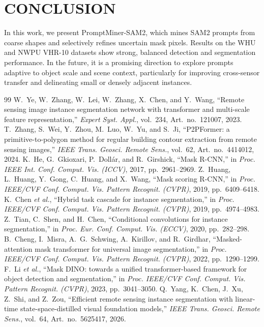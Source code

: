 \documentclass{article}
\begin{document}
\vspace{-1.5\baselineskip}
\section{CONCLUSION}
In this work, we present PromptMiner-SAM2, which mines SAM2 prompts from coarse shapes and selectively refines uncertain mask pixels. 
Results on the WHU and NWPU VHR-10 datasets show strong, balanced detection and segmentation performance. 
In the future, it is a promising direction to explore prompts adaptive to object scale and scene context, particularly for improving cross-sensor transfer and delineating small or densely adjacent instances.


\begin{thebibliography}{99}
 W.~Ye, W.~Zhang, W.~Lei, W.~Zhang, X.~Chen, and Y.~Wang, ``Remote sensing image instance segmentation network with transformer and multi-scale feature representation,'' \textit{Expert Syst. Appl.}, vol.~234, Art.~no.~121007, 2023.
 T.~Zhang, S.~Wei, Y.~Zhou, M.~Luo, W.~Yu, and S.~Ji, ``P2PFormer: a primitive-to-polygon method for regular building contour extraction from remote sensing images,'' \textit{IEEE Trans. Geosci. Remote Sens.}, vol.~62, Art.~no.~4414012, 2024.
 K.~He, G.~Gkioxari, P.~Doll\'ar, and R.~Girshick, ``Mask R-CNN,'' in \textit{Proc. IEEE Int. Conf. Comput. Vis. (ICCV)}, 2017, pp.~2961--2969.
 Z.~Huang, L.~Huang, Y.~Gong, C.~Huang, and X.~Wang, ``Mask scoring R-CNN,'' in \textit{Proc. IEEE/CVF Conf. Comput. Vis. Pattern Recognit. (CVPR)}, 2019, pp.~6409--6418.
 K.~Chen \textit{et al.}, ``Hybrid task cascade for instance segmentation,'' in \textit{Proc. IEEE/CVF Conf. Comput. Vis. Pattern Recognit. (CVPR)}, 2019, pp.~4974--4983.
 Z.~Tian, C.~Shen, and H.~Chen, ``Conditional convolutions for instance segmentation,'' in \textit{Proc. Eur. Conf. Comput. Vis. (ECCV)}, 2020, pp.~282--298.
 B.~Cheng, I.~Misra, A.~G.~Schwing, A.~Kirillov, and R.~Girdhar, ``Masked-attention mask transformer for universal image segmentation,'' in \textit{Proc. IEEE/CVF Conf. Comput. Vis. Pattern Recognit. (CVPR)}, 2022, pp.~1290--1299.
 F.~Li \textit{et al.}, ``Mask DINO: towards a unified transformer-based framework for object detection and segmentation,'' in \textit{Proc. IEEE/CVF Conf. Comput. Vis. Pattern Recognit. (CVPR)}, 2023, pp.~3041--3050.
 Q.~Yang, K.~Chen, J.~Xu, Z.~Shi, and Z.~Zou, ``Efficient remote sensing instance segmentation with linear-time state-space-distilled visual foundation models,'' \textit{IEEE Trans. Geosci. Remote Sens.}, vol.~64, Art.~no.~5625417, 2026.

\end{thebibliography}
\end{document}
